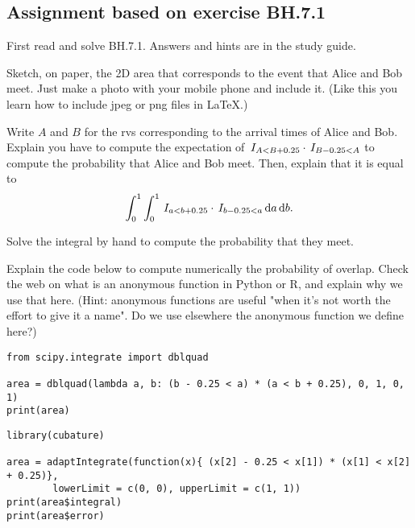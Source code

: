 \subsection{Assignment based on exercise BH.7.1}
\label{sec:bh.7.1}

First read and solve BH.7.1. Answers and hints are in the study guide.


\begin{exercise}\label{ex:ab}
Sketch, on paper, the 2D area that corresponds to the event that Alice and Bob meet. Just make a photo with your mobile phone and include it. (Like this you learn how to include jpeg or png files in \LaTeX.)
\end{exercise}

\begin{exercise}
Write $A$ and $B$ for the rvs corresponding to the arrival times of Alice and Bob.
Explain  you have to compute the expectation of  $\,I_{A<B+0.25}\cdot\,I_{B-0.25 < A}$
to compute the probability that Alice and Bob meet.
Then,  explain that it is equal to
\begin{equation}
\int_0^1\int_0^1 \,I_{a<b+0.25}\cdot \,I_{b-0.25 < a} \,\textrm{d}a \,\textrm{d}b.
\end{equation}
\end{exercise}

\begin{exercise}
Solve the integral by hand to compute  the probability that they meet.
\end{exercise}

\begin{exercise}
Explain the  code below to compute numerically the probability of overlap. Check the web on what is an anonymous function in Python or R, and explain why we use that here.
(Hint: anonymous functions are useful "when it’s not worth the effort to give it a name". Do we use elsewhere the anonymous function we define here?)
\begin{verbatim}
from scipy.integrate import dblquad

area = dblquad(lambda a, b: (b - 0.25 < a) * (a < b + 0.25), 0, 1, 0, 1)
print(area)
\end{verbatim}

\begin{verbatim}
library(cubature)

area = adaptIntegrate(function(x){ (x[2] - 0.25 < x[1]) * (x[1] < x[2] + 0.25)},
        lowerLimit = c(0, 0), upperLimit = c(1, 1))
print(area$integral)
print(area$error)
\end{verbatim}
\end{exercise}

